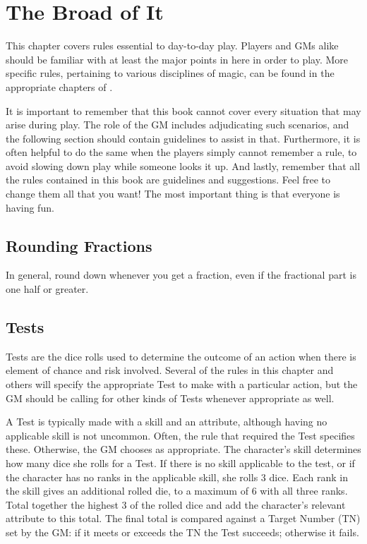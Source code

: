 \chapter{The Broad of It}

This chapter covers rules essential to day-to-day play.
Players and GMs alike should be familiar with at least the major points in here in order to play.
More specific rules, pertaining to various disciplines of magic, can be found in the appropriate chapters of .

It is important to remember that this book cannot cover every situation that may arise during play.
The role of the GM includes adjudicating such scenarios, and the following section should contain guidelines to assist in that.
Furthermore, it is often helpful to do the same when the players simply cannot remember a rule, to avoid slowing down play while someone looks it up.
And lastly, remember that all the rules contained in this book are guidelines and suggestions.
Feel free to change them all that you want!
The most important thing is that everyone is having fun.

\section{Rounding Fractions}

In general, round down whenever you get a fraction, even if the fractional part is one half or greater.

\section{Tests}

Tests are the dice rolls used to determine the outcome of an action when there is element of chance and risk involved.
Several of the rules in this chapter and others will specify the appropriate Test to make with a particular action, but the GM should be calling for other kinds of Tests whenever appropriate as well.

A Test is typically made with a skill and an attribute, although having no applicable skill is not uncommon.
Often, the rule that required the Test specifies these.
Otherwise, the GM chooses as appropriate.
The character's skill determines how many dice she rolls for a Test.
If there is no skill applicable to the test, or if the character has no ranks in the applicable skill, she rolls 3 dice.
Each rank in the skill gives an additional rolled die, to a maximum of 6 with all three ranks.
Total together the highest 3 of the rolled dice and add the character's relevant attribute to this total.
The final total is compared against a Target Number (TN) set by the GM: if it meets or exceeds the TN the Test succeeds; otherwise it fails.

